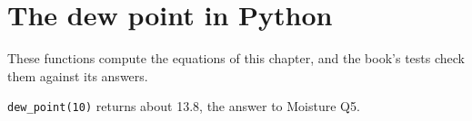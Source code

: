 \section{The dew point in Python}

These functions compute the equations of this chapter, and the book's tests check them against its answers.






\verb|dew_point(10)| returns about 13.8, the answer to Moisture Q5.
